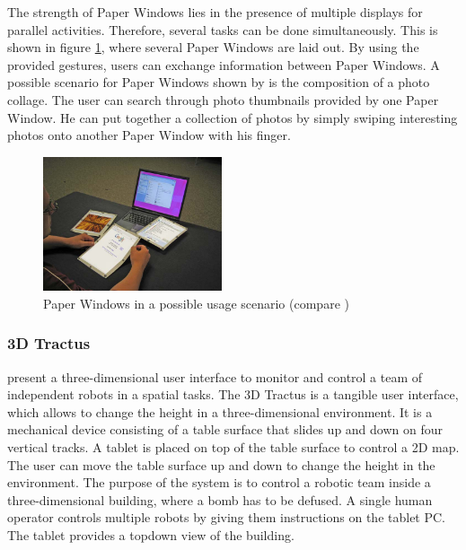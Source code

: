The strength of Paper Windows lies in the presence of multiple displays for parallel activities. Therefore, several tasks can be done simultaneously. This is shown in figure \ref{fig:paperwindows}, where several Paper Windows are laid out. By using the provided gestures, users can exchange information between Paper Windows. A possible scenario for Paper Windows shown by \cite{holman05} is the composition of a photo collage. The user can search through photo thumbnails provided by one Paper Window. He can put together a collection of photos by simply swiping interesting photos onto another Paper Window with his finger.

\begin{figure}
\centering
\includegraphics[width=0.47\textwidth]{figures/paperwindows.jpg}
\caption{Paper Windows in a possible usage scenario (compare \protect\cite{holman05})}
\label{fig:paperwindows}
\end{figure}

\subsubsection{3D Tractus}
\cite{lapides00} present a three-dimensional user interface to monitor and control a team of independent robots in a spatial tasks. The 3D Tractus is a tangible user interface, which allows to change the height in a three-dimensional environment. It is a mechanical device consisting of a table surface that slides up and down on four vertical tracks. A tablet is placed on top of the table surface to control a 2D map. The user can move the table surface up and down to change the height in the environment. The purpose of the system is to control a robotic team inside a three-dimensional building, where a bomb has to be defused. A single human operator controls multiple robots by giving them instructions on the tablet PC. The tablet provides a topdown view of the building.